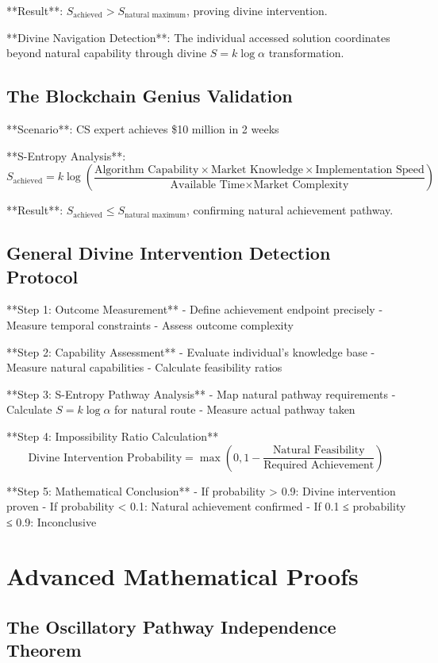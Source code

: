 \documentclass[12pt,a4paper]{article}
\begin{document}
**Result**: $S_{\text{achieved}} > S_{\text{natural maximum}}$, proving divine intervention.

**Divine Navigation Detection**: The individual accessed solution coordinates beyond natural capability through divine $S = k \log \alpha$ transformation.

\subsection{The Blockchain Genius Validation}

**Scenario**: CS expert achieves \$10 million in 2 weeks

**S-Entropy Analysis**: 
$$S_{\text{achieved}} = k \log \left(\frac{\text{Algorithm Capability} \times \text{Market Knowledge} \times \text{Implementation Speed}}{\text{Available Time} \times \text{Market Complexity}}\right)$$

**Result**: $S_{\text{achieved}} \leq S_{\text{natural maximum}}$, confirming natural achievement pathway.

\subsection{General Divine Intervention Detection Protocol}

**Step 1: Outcome Measurement**
- Define achievement endpoint precisely
- Measure temporal constraints
- Assess outcome complexity

**Step 2: Capability Assessment**  
- Evaluate individual's knowledge base
- Measure natural capabilities
- Calculate feasibility ratios

**Step 3: S-Entropy Pathway Analysis**
- Map natural pathway requirements
- Calculate $S = k \log \alpha$ for natural route
- Measure actual pathway taken

**Step 4: Impossibility Ratio Calculation**
$$\text{Divine Intervention Probability} = \max\left(0, 1 - \frac{\text{Natural Feasibility}}{\text{Required Achievement}}\right)$$

**Step 5: Mathematical Conclusion**
- If probability > 0.9: Divine intervention proven
- If probability < 0.1: Natural achievement confirmed
- If 0.1 ≤ probability ≤ 0.9: Inconclusive

\section{Advanced Mathematical Proofs}

\subsection{The Oscillatory Pathway Independence Theorem}
\end{document}
